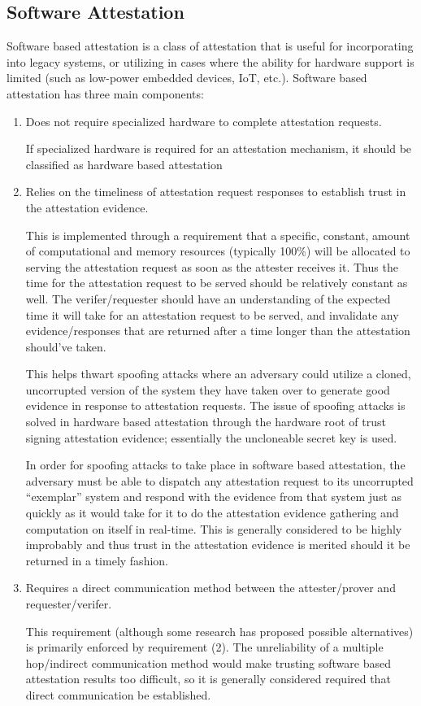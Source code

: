\documentclass[acmsmall]{acmart}
\theoremstyle{definition}
\begin{document}
\subsection{Software Attestation}
Software based attestation is a class of attestation that is useful for incorporating into legacy systems,
or utilizing in cases where the ability for hardware support is limited
(such as low-power embedded devices, IoT, etc.).
Software based attestation has three main components:
\begin{enumerate}
  \item Does not require specialized hardware to complete attestation requests.

        If specialized hardware is required for an attestation mechanism, it should be classified as hardware based attestation
  \item Relies on the timeliness of attestation request responses to establish trust in the attestation evidence.

        This is implemented through a requirement that a specific, constant, amount of computational and memory resources (typically 100\%) will be allocated to serving the attestation request as soon as the attester receives it. Thus the time for the attestation request to be served should be relatively constant as well.
        The verifer/requester should have an understanding of the expected time it will take for an attestation request to be served, and invalidate any evidence/responses that are returned after a time longer than the attestation should've taken.

        This helps thwart spoofing attacks where an adversary could utilize a cloned, uncorrupted version of the system they have taken over to generate good evidence in response to attestation requests. The issue of spoofing attacks is solved in hardware based attestation through the hardware root of trust signing attestation evidence; essentially the uncloneable secret key is used.

        In order for spoofing attacks to take place in software based attestation, the adversary must be able to dispatch any attestation request to its uncorrupted ``exemplar'' system and respond with the evidence from that system just as quickly as it would take for it to do the attestation evidence gathering and computation on itself in real-time.
        This is generally considered to be highly improbably and thus trust in the attestation evidence is merited should it be returned in a timely fashion.

  \item Requires a direct communication method between the attester/prover and requester/verifer.

        This requirement (although some research has proposed possible alternatives)
        is primarily enforced by requirement (2).
        The unreliability of a multiple hop/indirect communication method would make trusting
        software based attestation results too difficult, so it is generally considered required that direct communication be established.
\end{enumerate}
\end{document}

